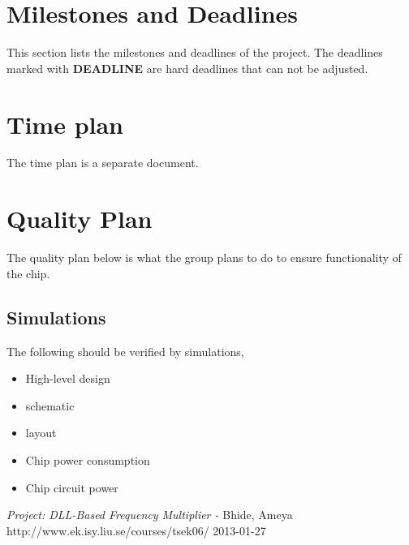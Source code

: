 \documentclass[a4paper,12pt]{article} \usepackage{graphicx}
\begin{document}
\section{Milestones and Deadlines}
This section lists the milestones and deadlines of the project.
The deadlines marked with \textbf{DEADLINE} are hard 
deadlines that can not be adjusted.

\begin{LIPSdeadlines}
\end{LIPSdeadlines}

\section{Time plan}
The time plan is a separate document.

\section{Quality Plan} 
The quality plan below is what the group plans to do to ensure functionality of the chip. 
\subsection{Simulations} 
The following should be verified by simulations,

\begin{itemize}
\item High-level design
\item schematic
\item layout
\item Chip power consumption
\item Chip circuit power
\end{itemize}

\newpage 
\appendix 
\newpage


\begin{thebibliography}{99}
\textit{Project: DLL-Based Frequency Multiplier - } Bhide,
Ameya
\\ http://www.ek.isy.liu.se/courses/tsek06/ 2013-01-27
\end{thebibliography}
\end{document}
